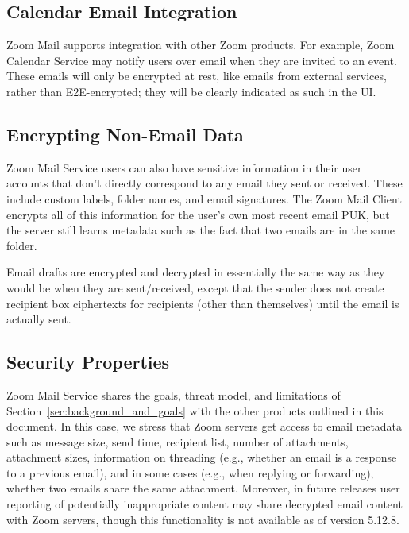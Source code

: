 \subsection{Calendar Email Integration}

Zoom Mail supports integration with other Zoom products. For example, Zoom Calendar Service may
notify users over email when they are invited to an event. These emails will only be encrypted at
rest, like emails from external services, rather than E2E-encrypted; they will be clearly indicated
as such in the UI.

\subsection{Encrypting Non-Email Data}

Zoom Mail Service users can also have sensitive information in their user accounts that don't
directly correspond to any email they sent or received. These include custom labels, folder names, and
email signatures. The Zoom Mail Client encrypts all of this information for the user's own most
recent email PUK, but the server still learns metadata such as the fact that two emails are in the
same folder.

Email drafts are encrypted and decrypted in essentially the same way as they would be when they are
sent/received, except that the sender does not create recipient box ciphertexts for recipients
(other than themselves) until the email is actually sent.

\subsection{Security Properties}

Zoom Mail Service shares the goals, threat model, and limitations of
Section~\ref{sec:background_and_goals} with the other products outlined in this document. In this
case, we stress that Zoom servers get access to email metadata such as message size, send time,
recipient list, number of attachments, attachment sizes, information on threading (e.g., whether an
email is a response to a previous email), and in some cases (e.g., when replying or forwarding),
whether two emails share the same attachment. Moreover, in future releases user reporting of
potentially inappropriate content may share decrypted email content with Zoom servers, though this
functionality is not available as of version 5.12.8.


